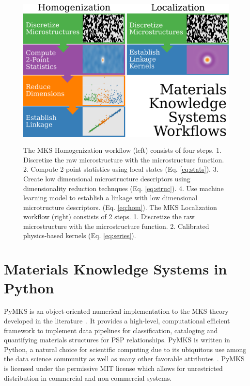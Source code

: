 \documentclass{bmcart}
\begin{document}
\begin{figure}[h!]
  \caption{
     The MKS Homogenization workflow (left) consists of four steps. 1.
     Discretize the raw microstructure with the microstructure function.
     2. Compute 2-point statistics using local states (Eq. \ref{eq:stats}).
     3. Create low dimensional microstructure descriptors using dimensionality
     reduction technques (Eq. \ref{eq:struc}).
     4. Use machine learning model to establish a linkage with low dimensional
     microtructure descriptors. (Eq. \ref{eq:hom}).
     The MKS Localization workflow (right) constists of 2 steps.
     1. Discretize the raw microstructure with the microstructure function.
     2. Calibrated physics-based kernels (Eq. \ref{eq:series}).}
    \includegraphics[scale=.22]{fig/mks_workflows.png}
  \label{fig:workflows}
\end{figure}


\section{Materials Knowledge Systems in Python}

PyMKS is an object-oriented numerical implementation to the MKS theory
developed in the literature~\cite{kalidindi2010novel}. It provides a
high-level, computational efficient framework to implement data
pipelines for classification, cataloging and quantifying materials
structures for PSP relationships. PyMKS is written in Python, a
natural choice for scientific computing due to its ubiquitous use
among the data science community as well as many other favorable
attributes~\cite{perez2011python}. PyMKS is licensed under the
permissive MIT license \cite{MIT} which allows for unrestricted
distribution in commercial and non-commercial systems.
\end{document}

